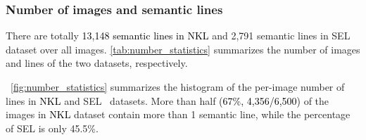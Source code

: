 \documentclass[10pt,journal,cspaper,compsoc]{IEEEtran}
\newcommand{\revise}[1]{{\textcolor{black}{#1}}}
\newcommand{\CheckRmv}[1]{}
\newcommand{\CheckRmv}[1]{#1}
\begin{document}
\subsubsection{Number of images and semantic lines}
There are totally \revise{13,148 semantic lines in NKL} and 2,791 semantic lines in
SEL~\cite{lee2017semantic} dataset over all images.
\cref{tab:number_statistics} summarizes the number of images and lines of the two datasets, respectively.

~\cref{fig:number_statistics} summarizes the histogram of the per-image number of lines
in \revise{NKL} and SEL~\cite{lee2017semantic} datasets.
More than half \revise{(67\%, 4,356/6,500)} of the images in \revise{NKL} dataset contain more than 1 semantic line,
while the percentage of SEL is only 45.5\%.

\CheckRmv{
\begin{figure}[!htb]
  \centering
  \begin{overpic}[width=1\linewidth]{figures/line_numbers.pdf}
    \put(15, 26){\rotatebox{30}{\scriptsize 33.0\%}}
    \put(19, 41){\rotatebox{30}{\scriptsize 54.5\%}}
    
    \put(26, 31){\rotatebox{29}{\scriptsize 40.2\%}}
    \put(30, 25.5){\rotatebox{30}{\scriptsize 31.5\%}}

    \put(37, 17.3){\rotatebox{30}{\scriptsize 19.4\%}}
    \put(40, 11.5){\rotatebox{30}{\scriptsize 11.3\%}}

    \put(47, 8.6){\rotatebox{30}{\scriptsize 6.7\%}}
    \put(51, 5){\rotatebox{30}{\scriptsize 2.1\%}}

    \put(58.5, 5.5){\rotatebox{30}{\scriptsize 0.54\%}}
    \put(62.2, 4.5){\rotatebox{30}{\scriptsize 0.41\%}}

    \put(69, 4.8){\rotatebox{30}{\scriptsize 0.01\%}}
    \put(73, 4.2){\rotatebox{30}{\scriptsize 0.01\%}}

    \put(80, 5){\rotatebox{30}{\scriptsize 0.01\%}}
    \put(83, 4){\rotatebox{30}{\scriptsize 0}}

    \put(90.5, 5){\rotatebox{30}{\scriptsize 0.003\%}}
    \put(93.5, 4){\rotatebox{30}{\scriptsize 0}}

    \put(78, 39.6){\scriptsize NKL (Ours)}
    \put(78, 34.4){\scriptsize SEL~\cite{lee2017semantic}}
  \end{overpic}
  \caption{
    \revise{Histogram chart of number of lines.
Lines of our dataset are more fairly distributed compared to
    SEL.}
  }
  \label{fig:number_statistics}
\end{figure}
}
\end{document}
